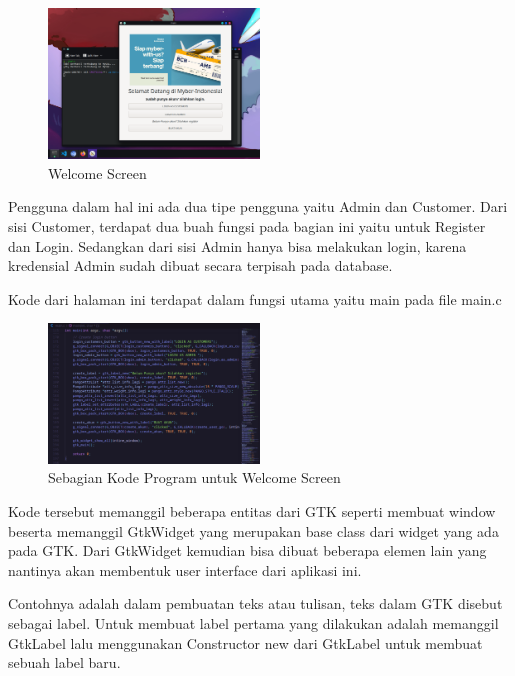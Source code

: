 \documentclass[a4paper,12pt]{article}
\begin{document}
\begin{figure}[!htbp]
    \centering
    \includegraphics[width=0.5\textwidth]{./Welcome.png}
    \caption{Welcome Screen}

\end{figure}
\FloatBarrier 

Pengguna dalam hal ini ada dua tipe pengguna yaitu Admin dan Customer. 
Dari sisi Customer, terdapat dua buah fungsi pada bagian ini yaitu untuk Register dan Login.
Sedangkan dari sisi Admin hanya bisa melakukan login, karena kredensial Admin sudah dibuat secara terpisah pada database.

Kode dari halaman ini terdapat dalam fungsi utama yaitu main pada file main.c 
\begin{figure}[!htbp]
    \centering
    \includegraphics[width=0.5\textwidth]{./docs_main.png}
    \caption{Sebagian Kode Program untuk Welcome Screen}

\end{figure}
\FloatBarrier 

Kode tersebut memanggil beberapa entitas dari GTK seperti membuat window beserta memanggil GtkWidget yang merupakan base class dari widget yang ada pada GTK.
Dari GtkWidget kemudian bisa dibuat beberapa elemen lain yang nantinya akan membentuk user interface dari aplikasi ini.

Contohnya adalah dalam pembuatan teks atau tulisan, teks dalam GTK disebut sebagai label. Untuk membuat label pertama yang dilakukan adalah memanggil GtkLabel lalu menggunakan Constructor new dari GtkLabel untuk membuat sebuah label baru.
\end{document}
